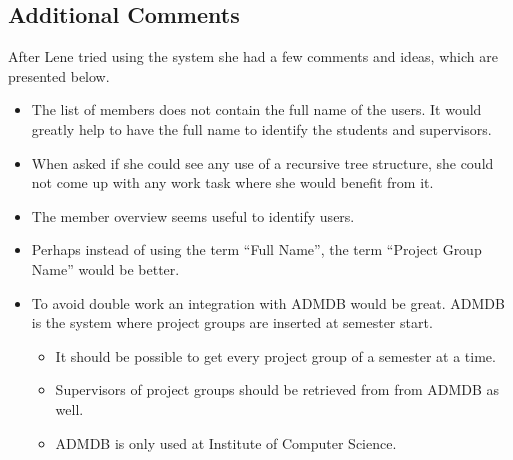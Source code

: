 \subsection*{Additional Comments}
After Lene tried using the system she had a few comments and ideas, which are presented below.
\begin{itemize}
	\item The list of members does not contain the full name of the users.
	It would greatly help to have the full name to identify the students and supervisors.
	\item When asked if she could see any use of a recursive tree structure, she could not come up with any work task where she would benefit from it.
	\item The member overview seems useful to identify users.
	\item Perhaps instead of using the term ``Full Name'', the term ``Project Group Name'' would be better.
	\item To avoid double work an integration with ADMDB would be great.
	ADMDB is the system where project groups are inserted at semester start.
	\begin{itemize}
		\item It should be possible to get every project group of a semester at a time.
		\item Supervisors of project groups should be retrieved from from ADMDB as well.
		\item ADMDB is only used at Institute of Computer Science.
	\end{itemize}
\end{itemize}
